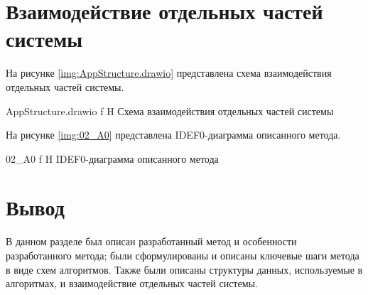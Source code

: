 \section{Взаимодействие отдельных частей системы}

На рисунке \ref{img:AppStructure.drawio} представлена схема взаимодействия отдельных частей системы.

{AppStructure.drawio}
{f}
{H}
{\textwidth}
{Схема взаимодействия отдельных частей системы}

На рисунке \ref{img:02_A0} представлена IDEF0-диаграмма описанного метода.

{02_A0}
{f}
{H}
{\textwidth}
{IDEF0-диаграмма описанного метода}

\section*{Вывод}

В данном разделе был описан разработанный метод и особенности разработанного метода; были сформулированы и описаны ключевые шаги метода в виде схем алгоритмов. Также были описаны структуры данных, используемые в алгоритмах, и взаимодействие отдельных частей системы.